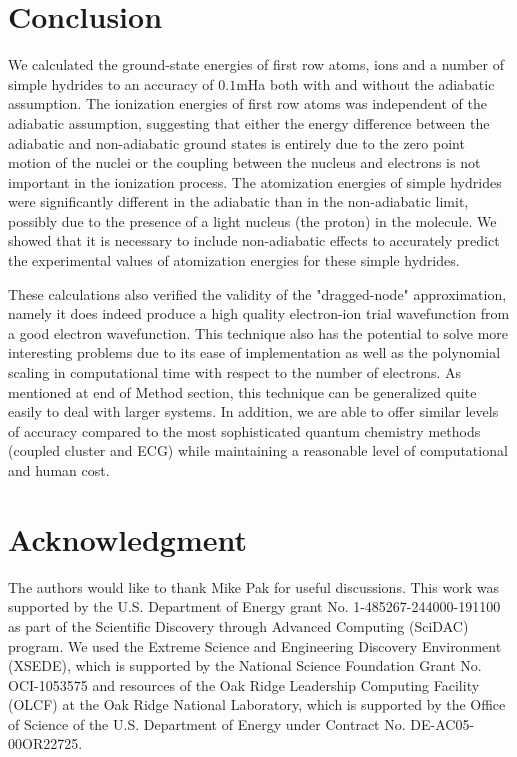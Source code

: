 \documentclass[aps,prl,superscriptaddress,groupedaddress]{revtex4}
\begin{document}
\section{Conclusion}
We calculated the ground-state energies of first row atoms, ions and a number of simple hydrides to an accuracy of $0.1$mHa both with and without the adiabatic assumption. The ionization energies of first row atoms was independent of the adiabatic assumption, suggesting that either the energy difference between the adiabatic and non-adiabatic ground states is entirely due to the zero point motion of the nuclei or the coupling between the nucleus and electrons is not important in the ionization process. The atomization energies of simple hydrides were significantly different in the adiabatic than in the non-adiabatic limit, possibly due to the presence of a light nucleus (the proton) in the molecule. We showed that it is necessary to include non-adiabatic effects to accurately predict the experimental values of atomization energies for these simple hydrides.

These calculations also verified the validity of the "dragged-node" approximation, namely it does indeed produce a high quality electron-ion trial wavefunction from a good electron wavefunction. This technique also has the potential to solve more interesting problems due to its ease of implementation as well as the polynomial scaling in computational time with respect to the number of electrons. As mentioned at end of Method section, this technique can be generalized quite easily to deal with larger systems. In addition, we are able to offer similar levels of accuracy compared to the most sophisticated quantum chemistry methods (coupled cluster and ECG) while maintaining a reasonable level of computational and human cost.

\section{Acknowledgment}
The authors would like to thank Mike Pak for useful discussions. This work was supported by the U.S. Department of Energy grant No. 1-485267-244000-191100 as part of the Scientific Discovery through Advanced Computing (SciDAC) program. We used the Extreme Science and Engineering Discovery Environment (XSEDE), which is supported by the National Science Foundation Grant No. OCI-1053575 and resources of the Oak Ridge Leadership Computing Facility (OLCF) at the Oak Ridge National Laboratory, which is supported by the Office of Science of the U.S. Department of Energy under Contract No. DE-AC05-00OR22725.

\pagebreak


\end{document}
